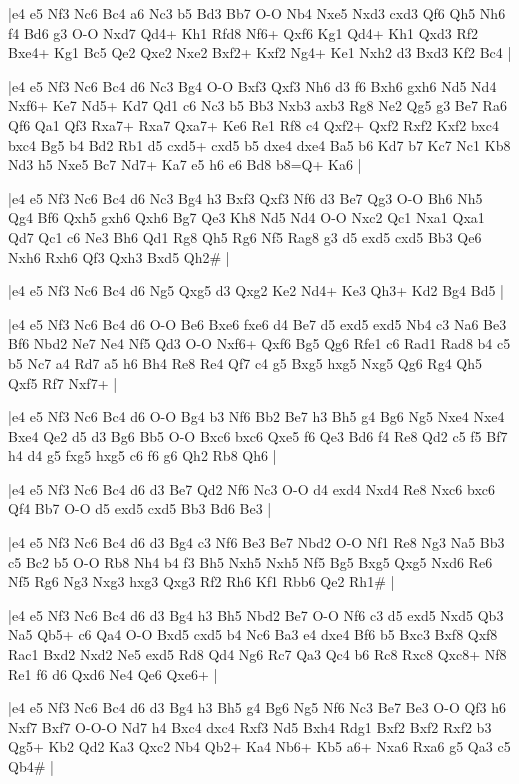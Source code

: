 \whitename{}
\blackname{}
\makegametitle
|e4 e5 Nf3 Nc6 Bc4 a6 Nc3 b5 Bd3 Bb7 O-O Nb4 Nxe5 Nxd3 cxd3 Qf6 Qh5 Nh6 f4 Bd6 g3 O-O Nxd7 Qd4+ Kh1 Rfd8 Nf6+ Qxf6 Kg1 Qd4+ Kh1 Qxd3 Rf2 Bxe4+ Kg1 Bc5 Qe2 Qxe2 Nxe2 Bxf2+ Kxf2 Ng4+ Ke1 Nxh2 d3 Bxd3 Kf2 Bc4  |

\whitename{}
\blackname{}
\makegametitle
|e4 e5 Nf3 Nc6 Bc4 d6 Nc3 Bg4 O-O Bxf3 Qxf3 Nh6 d3 f6 Bxh6 gxh6 Nd5 Nd4 Nxf6+ Ke7 Nd5+ Kd7 Qd1 c6 Nc3 b5 Bb3 Nxb3 axb3 Rg8 Ne2 Qg5 g3 Be7 Ra6 Qf6 Qa1 Qf3 Rxa7+ Rxa7 Qxa7+ Ke6 Re1 Rf8 c4 Qxf2+ Qxf2 Rxf2 Kxf2 bxc4 bxc4 Bg5 b4 Bd2 Rb1 d5 cxd5+ cxd5 b5 dxe4 dxe4 Ba5 b6 Kd7 b7 Kc7 Nc1 Kb8 Nd3 h5 Nxe5 Bc7 Nd7+ Ka7 e5 h6 e6 Bd8 b8=Q+ Ka6  |

\whitename{}
\blackname{}
\makegametitle
|e4 e5 Nf3 Nc6 Bc4 d6 Nc3 Bg4 h3 Bxf3 Qxf3 Nf6 d3 Be7 Qg3 O-O Bh6 Nh5 Qg4 Bf6 Qxh5 gxh6 Qxh6 Bg7 Qe3 Kh8 Nd5 Nd4 O-O Nxc2 Qc1 Nxa1 Qxa1 Qd7 Qc1 c6 Ne3 Bh6 Qd1 Rg8 Qh5 Rg6 Nf5 Rag8 g3 d5 exd5 cxd5 Bb3 Qe6 Nxh6 Rxh6 Qf3 Qxh3 Bxd5 Qh2\#  |

\whitename{}
\blackname{}
\makegametitle
|e4 e5 Nf3 Nc6 Bc4 d6 Ng5 Qxg5 d3 Qxg2 Ke2 Nd4+ Ke3 Qh3+ Kd2 Bg4 Bd5  |

\whitename{}
\blackname{}
\makegametitle
|e4 e5 Nf3 Nc6 Bc4 d6 O-O Be6 Bxe6 fxe6 d4 Be7 d5 exd5 exd5 Nb4 c3 Na6 Be3 Bf6 Nbd2 Ne7 Ne4 Nf5 Qd3 O-O Nxf6+ Qxf6 Bg5 Qg6 Rfe1 c6 Rad1 Rad8 b4 c5 b5 Nc7 a4 Rd7 a5 h6 Bh4 Re8 Re4 Qf7 c4 g5 Bxg5 hxg5 Nxg5 Qg6 Rg4 Qh5 Qxf5 Rf7 Nxf7+  |

\whitename{}
\blackname{}
\makegametitle
|e4 e5 Nf3 Nc6 Bc4 d6 O-O Bg4 b3 Nf6 Bb2 Be7 h3 Bh5 g4 Bg6 Ng5 Nxe4 Nxe4 Bxe4 Qe2 d5 d3 Bg6 Bb5 O-O Bxc6 bxc6 Qxe5 f6 Qe3 Bd6 f4 Re8 Qd2 c5 f5 Bf7 h4 d4 g5 fxg5 hxg5 c6 f6 g6 Qh2 Rb8 Qh6  |

\whitename{}
\blackname{}
\makegametitle
|e4 e5 Nf3 Nc6 Bc4 d6 d3 Be7 Qd2 Nf6 Nc3 O-O d4 exd4 Nxd4 Re8 Nxc6 bxc6 Qf4 Bb7 O-O d5 exd5 cxd5 Bb3 Bd6 Be3  |

\whitename{}
\blackname{}
\makegametitle
|e4 e5 Nf3 Nc6 Bc4 d6 d3 Bg4 c3 Nf6 Be3 Be7 Nbd2 O-O Nf1 Re8 Ng3 Na5 Bb3 c5 Bc2 b5 O-O Rb8 Nh4 b4 f3 Bh5 Nxh5 Nxh5 Nf5 Bg5 Bxg5 Qxg5 Nxd6 Re6 Nf5 Rg6 Ng3 Nxg3 hxg3 Qxg3 Rf2 Rh6 Kf1 Rbb6 Qe2 Rh1\#  |

\whitename{}
\blackname{}
\makegametitle
|e4 e5 Nf3 Nc6 Bc4 d6 d3 Bg4 h3 Bh5 Nbd2 Be7 O-O Nf6 c3 d5 exd5 Nxd5 Qb3 Na5 Qb5+ c6 Qa4 O-O Bxd5 cxd5 b4 Nc6 Ba3 e4 dxe4 Bf6 b5 Bxc3 Bxf8 Qxf8 Rac1 Bxd2 Nxd2 Ne5 exd5 Rd8 Qd4 Ng6 Rc7 Qa3 Qc4 b6 Rc8 Rxc8 Qxc8+ Nf8 Re1 f6 d6 Qxd6 Ne4 Qe6 Qxe6+  |

\whitename{}
\blackname{}
\makegametitle
|e4 e5 Nf3 Nc6 Bc4 d6 d3 Bg4 h3 Bh5 g4 Bg6 Ng5 Nf6 Nc3 Be7 Be3 O-O Qf3 h6 Nxf7 Bxf7 O-O-O Nd7 h4 Bxc4 dxc4 Rxf3 Nd5 Bxh4 Rdg1 Bxf2 Bxf2 Rxf2 b3 Qg5+ Kb2 Qd2 Ka3 Qxc2 Nb4 Qb2+ Ka4 Nb6+ Kb5 a6+ Nxa6 Rxa6 g5 Qa3 c5 Qb4\#  |

